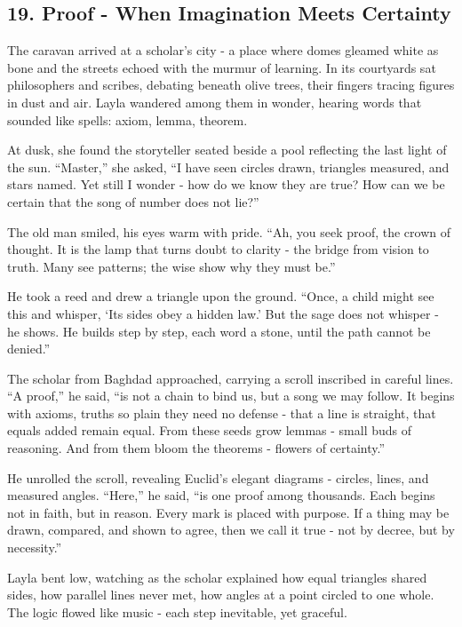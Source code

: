 \documentclass[
  letterpaper,
  DIV=11,
  numbers=noendperiod]{scrreprt}
\begin{document}
\subsection{19. Proof - When Imagination Meets
Certainty}\label{proof---when-imagination-meets-certainty}

The caravan arrived at a scholar's city - a place where domes gleamed
white as bone and the streets echoed with the murmur of learning. In its
courtyards sat philosophers and scribes, debating beneath olive trees,
their fingers tracing figures in dust and air. Layla wandered among them
in wonder, hearing words that sounded like spells: axiom, lemma,
theorem.

At dusk, she found the storyteller seated beside a pool reflecting the
last light of the sun. ``Master,'' she asked, ``I have seen circles
drawn, triangles measured, and stars named. Yet still I wonder - how do
we know they are true? How can we be certain that the song of number
does not lie?''

The old man smiled, his eyes warm with pride. ``Ah, you seek proof, the
crown of thought. It is the lamp that turns doubt to clarity - the
bridge from vision to truth. Many see patterns; the wise show why they
must be.''

He took a reed and drew a triangle upon the ground. ``Once, a child
might see this and whisper, `Its sides obey a hidden law.' But the sage
does not whisper - he shows. He builds step by step, each word a stone,
until the path cannot be denied.''

The scholar from Baghdad approached, carrying a scroll inscribed in
careful lines. ``A proof,'' he said, ``is not a chain to bind us, but a
song we may follow. It begins with axioms, truths so plain they need no
defense - that a line is straight, that equals added remain equal. From
these seeds grow lemmas - small buds of reasoning. And from them bloom
the theorems - flowers of certainty.''

He unrolled the scroll, revealing Euclid's elegant diagrams - circles,
lines, and measured angles. ``Here,'' he said, ``is one proof among
thousands. Each begins not in faith, but in reason. Every mark is placed
with purpose. If a thing may be drawn, compared, and shown to agree,
then we call it true - not by decree, but by necessity.''

Layla bent low, watching as the scholar explained how equal triangles
shared sides, how parallel lines never met, how angles at a point
circled to one whole. The logic flowed like music - each step
inevitable, yet graceful.
\end{document}

